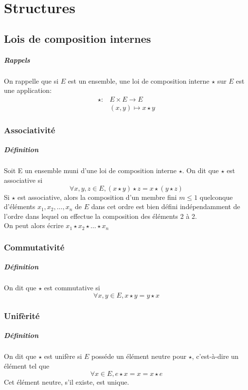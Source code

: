 \chapter{Structures}
\section{Lois de composition internes}
\paragraph{Rappels} On rappelle que si $E$ est un ensemble, une loi de composition interne $\star$ sur $E$ est une application:
\begin{eqnarray*}
\star{}: & E \times E \rightarrow E \\
& (x, y) \mapsto x \star y
\end{eqnarray*}

%
\subsection{Associativité}
%
\paragraph{Définition} Soit E un ensemble muni d'une loi de composition interne $\star$. On dit que $\star$ est associative si
$$ \forall x, y, z \in E, (x \star y) \star z = x \star (y \star z)$$
Si $\star$ est associative, alors la composition d'un membre fini $m \leq 1$ quelconque d'éléments $x_1, x_2, \ldots , x_n$ de $E$ dans cet ordre est bien défini indépendamment de l'ordre dans lequel on effectue la composition des éléments 2 à 2. \\
On peut alors écrire $x_1 \star x_2 \star \ldots \star x_n$

%
\subsection{Commutativité}
%
\paragraph{Définition} On dit que $\star$ est commutative si
$$ \forall x, y \in E, x \star y = y \star x$$

%
\subsection{Unifèrité}
%
\paragraph{Définition} On dit que $\star$ est unifère si $E$ posséde un élément neutre pour $\star$, c'est-à-dire un élément tel que
$$ \forall x \in E, e \star x = x = x \star e$$
Cet élément neutre, s'il existe, est unique.

